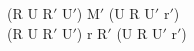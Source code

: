 (R U $\text{R}'$ $\text{U}'$) $\text{M}'$ (U R $\text{U}'$ $\text{r}'$)\\
(R U $\text{R}'$ $\text{U}'$) r $\text{R}'$ (U R $\text{U}'$ $\text{r}'$)\\
